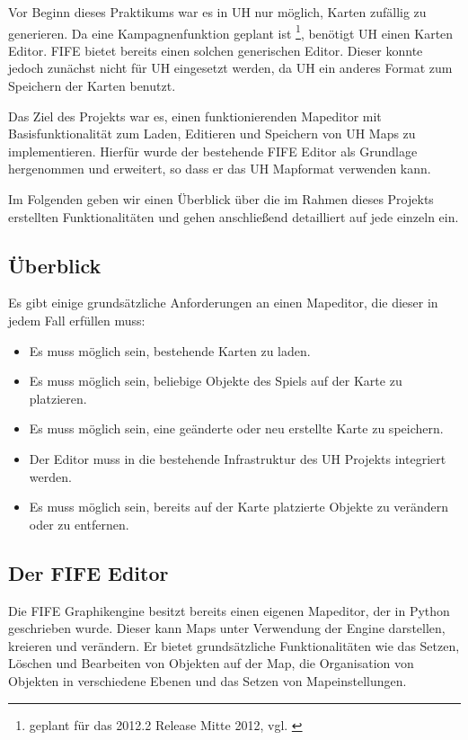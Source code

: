 Vor Beginn dieses Praktikums war es in UH nur möglich, Karten zufällig zu
generieren.
Da eine Kampagnenfunktion geplant ist \footnote{geplant für das 2012.2 Release Mitte 2012, vgl.
\cite{roadmap}}, benötigt UH einen Karten Editor. FIFE bietet bereits einen
solchen generischen Editor.
Dieser konnte jedoch zunächst nicht für UH eingesetzt werden, da UH ein
anderes Format zum Speichern der Karten benutzt.

Das Ziel des Projekts war es, einen funktionierenden Mapeditor mit Basisfunktionalität
zum Laden, Editieren und Speichern von UH Maps zu implementieren. Hierfür wurde
der bestehende FIFE Editor als Grundlage hergenommen und erweitert, so dass er das
UH Mapformat verwenden kann.

Im Folgenden geben wir einen Überblick über die im Rahmen dieses Projekts erstellten
Funktionalitäten und gehen anschließend detailliert auf jede einzeln ein.

\subsection{Überblick}
Es gibt einige grundsätzliche Anforderungen an einen Mapeditor, die dieser in jedem
Fall erfüllen muss:

\begin{itemize}
\item Es muss möglich sein, bestehende Karten zu laden.
\item Es muss möglich sein, beliebige Objekte des Spiels auf der Karte zu
platzieren.
\item Es muss möglich sein, eine geänderte oder neu erstellte Karte zu
speichern.
\item Der Editor muss in die bestehende Infrastruktur des UH Projekts integriert
werden.
\item Es muss möglich sein, bereits auf der Karte platzierte Objekte zu verändern oder
zu entfernen.
\end{itemize}

\subsection{Der FIFE Editor}
Die FIFE Graphikengine besitzt bereits einen eigenen Mapeditor, der in Python geschrieben
wurde. Dieser kann Maps unter
Verwendung der Engine darstellen, kreieren und verändern. Er bietet grundsätzliche
Funktionalitäten wie das Setzen, Löschen und Bearbeiten von Objekten auf der
Map, die Organisation von Objekten in verschiedene Ebenen und das Setzen von Mapeinstellungen.

